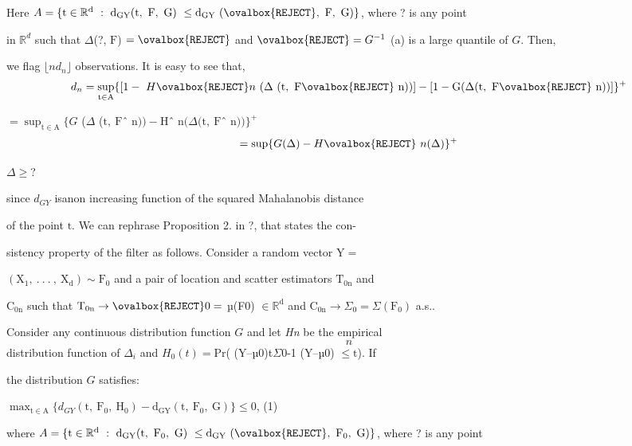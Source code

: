 \documentclass[a4paper,12pt]{article}
\begin{document}
Here $A=\{\mathrm{t}\in \mathbb{R}^{\mathrm{d}}\ :\ \mathrm{d}_{\mathrm{G}\mathrm{Y}}(\mathrm{t},\ \mathrm{F},\ \mathrm{G})\ \leq \mathrm{d}_{\mathrm{G}\mathrm{Y}}\ (\ovalbox{\tt\small REJECT},\ \mathrm{F},\ \mathrm{G})\}$, where ? is any point

in $\mathbb{R}^{d}$ such that $\Delta$(?, $\mathrm{F}$) $=\ovalbox{\tt\small REJECT}$ and $\ovalbox{\tt\small REJECT}=G^{-1}$ (a) is a large quantile of $G$. Then,

we flag $\lfloor nd_{n}\rfloor$ observations. It is easy to see that,
$$
d_{n}=\sup_{\mathrm{t}\in \mathrm{A}}\{[1-\ H\ovalbox{\tt\small REJECT} n\ (\Delta\ (\mathrm{t},\ \mathrm{F}\ovalbox{\tt\small REJECT}\ \mathrm{n}))]-[1-\mathrm{G}(\Delta(\mathrm{t},\ \mathrm{F}\ovalbox{\tt\small REJECT}\ \mathrm{n}))]\}^{+}
$$
\begin{center}
$=\displaystyle \sup_{\mathrm{t}\in \mathrm{A}}\{G$ ($\Delta$ ($\mathrm{t},\ \mathrm{F}$ˆ $\mathrm{n}))- \mathrm{H}$ˆ $\mathrm{n}(\Delta(\mathrm{t},\ \mathrm{F}$ˆ $\mathrm{n}))\}^{+}$
$$
=\sup\{G(\Delta)-H\ovalbox{\tt\small REJECT}\ n(\Delta)\}^{+}
$$
\end{center}
$\Delta\geq$?

since $d_{GY}$ isanon increasing function of the squared Mahalanobis distance

of the point $\mathrm{t}$. We can rephrase Proposition 2. in ?, that states the con-

sistency property of the filter as follows. Consider a random vector $\mathrm{Y} =$

$(\mathrm{X}_{1},\ .\ .\ .\ ,\ \mathrm{X}_{\mathrm{d}}) \sim \mathrm{F}_{0}$ and a pair of location and scatter estimators $\mathrm{T}_{0\mathrm{n}}$ and

$\mathrm{C}_{0\mathrm{n}}$ such that $\mathrm{T}_{0\mathrm{n}} \rightarrow\ovalbox{\tt\small REJECT} 0 =$ µ(F0) $\in \mathbb{R}^{\mathrm{d}}$ and $\mathrm{C}_{0\mathrm{n}} \rightarrow \Sigma_{0} = \Sigma(\mathrm{F}_{0})$ a.s..

Consider any continuous distribution function $G$ and let {\it Hn} be the empirical
$$
n
$$
distribution function of $\Delta_{i}$ and $H_{0}(t) =\mathrm{P}\mathrm{r}$( ($\mathrm{Y}$--µ0)t$\Sigma$0-1 (Y--µ0) $\leq \mathrm{t}$). If

the distribution $G$ satisfies:
\begin{center}
$\displaystyle \max_{\mathrm{t}\in \mathrm{A}}\{d_{GY}(\mathrm{t},\ \mathrm{F}_{0},\ \mathrm{H}_{0})-\mathrm{d}_{\mathrm{G}\mathrm{Y}}(\mathrm{t},\ \mathrm{F}_{0},\ \mathrm{G})\}\leq 0$,   (1)
\end{center}
where $A=\{\mathrm{t}\in \mathbb{R}^{\mathrm{d}}\ :\ \mathrm{d}_{\mathrm{G}\mathrm{Y}}(\mathrm{t},\ \mathrm{F}_{0},\ \mathrm{G})\ \leq \mathrm{d}_{\mathrm{G}\mathrm{Y}}\ (\ovalbox{\tt\small REJECT},\ \mathrm{F}_{0},\ \mathrm{G})\}$, where ? is any point
\end{document}
